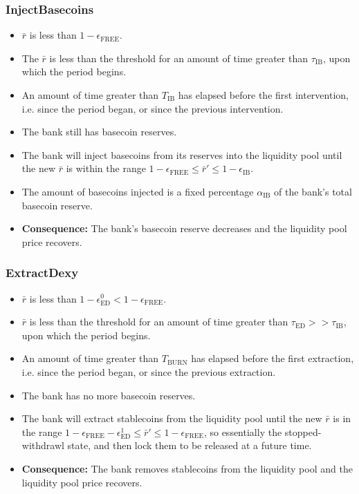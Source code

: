 \documentclass{ifcolog}
\newcommand{\rr}{\bar{r}}
\begin{document}
\subsubsection{InjectBasecoins}
  \begin{itemize}
    \item $\rr$ is less than $1 - \epsilon_{\textrm{FREE}}$.
    \item The $\rr$ is less than the threshold for an amount of time greater than $\tau_{\textrm{IB}}$, upon which the period begins.
    \item An amount of time greater than $T_{\textrm{IB}}$ has elapsed before the first intervention, i.e. since the period began, or since the previous intervention. 
    \item The bank still has basecoin reserves.
    \item The bank will inject basecoins from its reserves into the liquidity pool 
          until the new $\rr$ is within the range $1 - \epsilon_{\textrm{FREE}} \le \rr' \le 1-\epsilon_{\textrm{IB}}$.
    \item The amount of basecoins injected is a fixed percentage $\alpha_{\textrm{IB}}$ of the bank's total basecoin reserve.
    \item \textbf{Consequence:} The bank's basecoin reserve decreases and the liquidity pool price recovers.
  \end{itemize}

\subsubsection{ExtractDexy}
  \begin{itemize}
    \item $\rr$ is less than $1 - \epsilon_{\textrm{ED}}^{0} < 1 - \epsilon_{\textrm{FREE}}$.
    \item $\rr$ is less than the threshold for an amount of time greater than $\tau_{\textrm{ED}} >> \tau_{\textrm{IB}}$, upon which the period begins.
    \item An amount of time greater than $T_{\textrm{BURN}}$ has elapsed before the first extraction, i.e. since the period began, or since the previous extraction. 
    \item The bank has no more basecoin reserves.
    \item The bank will extract stablecoins from the liquidity pool until the new $\rr$ is in 
          the range $1 - \epsilon_{\textrm{FREE}} - \epsilon_{\textrm{ED}}^{1} \le \rr' \le 1-\epsilon_{\textrm{FREE}}$, 
          so essentially the stopped-withdrawl state, and then lock them to be released at a future time.
    \item \textbf{Consequence:} The bank removes stablecoins from the liquidity pool and the liquidity pool price recovers.
  \end{itemize}
\end{document}
